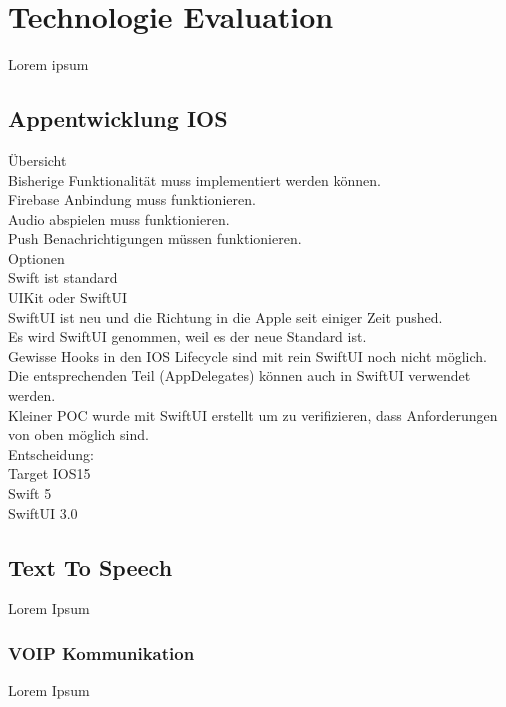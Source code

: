 \section{Technologie Evaluation}

Lorem ipsum

\subsection{Appentwicklung IOS}

Übersicht \\

Bisherige Funktionalität muss implementiert werden können. \\
Firebase Anbindung muss funktionieren. \\
Audio abspielen muss funktionieren. \\
Push Benachrichtigungen müssen funktionieren. \\

Optionen \\

Swift ist standard \\
UIKit oder SwiftUI \\

SwiftUI ist neu und die Richtung in die Apple seit einiger Zeit pushed. \\
Es wird SwiftUI genommen, weil es der neue Standard ist. \\
Gewisse Hooks in den IOS Lifecycle sind mit rein SwiftUI noch nicht möglich. \\
Die entsprechenden Teil (AppDelegates) können auch in SwiftUI verwendet werden. \\

Kleiner POC wurde mit SwiftUI erstellt um zu verifizieren, dass Anforderungen von oben möglich sind. \\

Entscheidung: \\

Target IOS15 \\
Swift 5 \\
SwiftUI 3.0 \\

\subsection{Text To Speech}

Lorem Ipsum

\subsubsection{VOIP Kommunikation}

Lorem Ipsum

\clearpage
